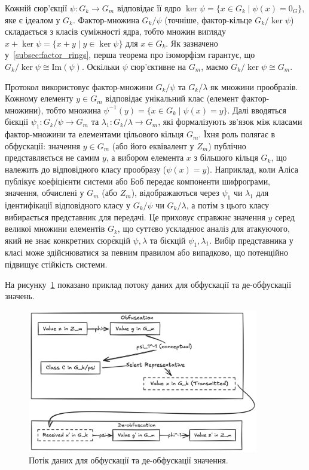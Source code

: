 Кожній сюр'єкції $\psi: G_k \to G_m$ відповідає її ядро $\ker \psi = \{x \in G_k \mid \psi(x) = 0_G\}$, яке є ідеалом у $G_k$.
Фактор-множина $G_k/\psi$ (точніше, фактор-кільце $G_k/\ker \psi$) складається з класів суміжності ядра, тобто множин вигляду $x + \ker \psi = \{x+y \mid y \in \ker \psi\}$ для $x \in G_k$.
Як зазначено у~\ref{subsec:factor_rings}, перша теорема про ізоморфізм гарантує, що $G_k/\ker \psi \cong \mathrm{Im}(\psi)$.
Оскільки $\psi$ сюр'єктивне на $G_m$, маємо $G_k/\ker \psi \cong G_m$.

Протокол використовує фактор-множини $G_k/\psi$ та $G_k/\lambda$ як множини прообразів.
Кожному елементу $y \in G_m$ відповідає унікальний клас (елемент фактор-множини), тобто множина $\psi^{-1}(y) = \{x \in G_k \mid \psi(x) = y\}$.
Далі вводяться бієкції $\psi_1: G_k/\psi \to G_m$ та $\lambda_1: G_k/\lambda \to G_m$, які формалізують зв'язок між класами фактор-множини та елементами цільового кільця $G_m$.
Їхня роль полягає в обфускації: значення $y \in G_m$ (або його еквівалент у $Z_m$) публічно представляється не самим $y$, а вибором елемента $x$ з більшого кільця $G_k$, що належить до відповідного класу прообразу ($\psi(x) = y$).
Наприклад, коли Аліса публікує коефіцієнти системи або Боб передає компоненти шифрограми, значення, обчислені у $G_m$ (або $Z_m$), відображаються через $\psi_1$ чи $\lambda_1$ для ідентифікації відповідного класу у $G_k/\psi$ чи $G_k/\lambda$, а потім з цього класу вибирається представник для передачі.
Це приховує справжнє значення $y$ серед великої множини елементів $G_k$, що суттєво ускладнює аналіз для атакуючого, який не знає конкретних сюр\'єкцій $\psi, \lambda$ та бієкцій $\psi_1, \lambda_1$.
Вибір представника у класі може здійснюватися за певним правилом або випадково, що потенційно підвищує стійкість системи.

На рисунку~\ref{fig:obfuscation_flow} показано приклад потоку даних для обфускації та де-обфускації значень.
\begin{figure}[ht]
    \centering
    \includegraphics[width=0.9\textwidth]{pictures/De-obfuscation Data Flow Example}
    \caption{Потік даних для обфускації та де-обфускації значення.}
    \label{fig:obfuscation_flow}
\end{figure}

